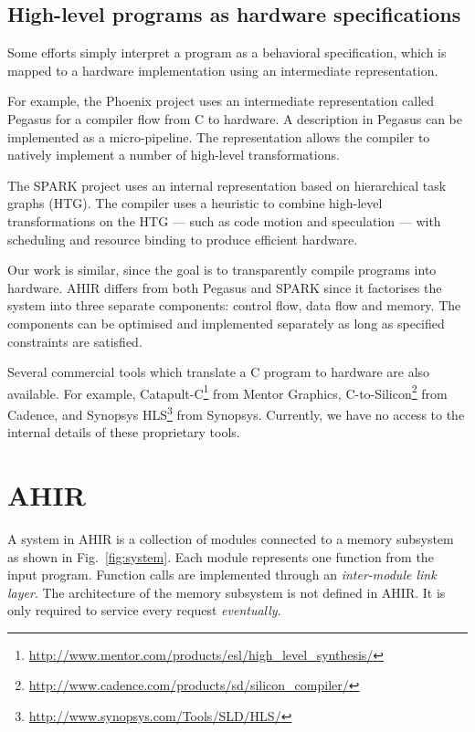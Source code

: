 \documentclass[conference]{IEEEtran}
\begin{document}
\subsection{High-level programs as hardware specifications}

Some efforts simply interpret a program as a behavioral
specification, which is mapped to a hardware implementation using an
intermediate representation.

For example, the Phoenix project uses an intermediate representation
called Pegasus\cite{pegasus-ir} for a compiler flow from C to
hardware\cite{pegasus-cash}. A description in Pegasus can be
implemented as a micro-pipeline. The representation allows the compiler
to natively implement a number of high-level transformations.

The SPARK\cite{spark-vlsi-paper} project uses an internal
representation based on hierarchical task graphs (HTG). The compiler
uses a heuristic to combine high-level transformations on the HTG ---
such as code motion and speculation\cite{spark-code-motion} --- with
scheduling and resource binding to produce efficient hardware.

Our work is similar, since the goal is to transparently compile
programs into hardware. AHIR differs from both Pegasus and SPARK since
it factorises the system into three separate components: control flow,
data flow and memory.  The components can be optimised and
implemented separately as long as specified constraints are satisfied.

Several commercial tools which translate a C program to hardware are
also available. For example,
Catapult-C\footnote{\url{http://www.mentor.com/products/esl/high_level_synthesis/}}
from Mentor Graphics,
C-to-Silicon\footnote{\url{http://www.cadence.com/products/sd/silicon_compiler/}}
from Cadence, and Synopsys
HLS\footnote{\url{http://www.synopsys.com/Tools/SLD/HLS/}} from
Synopsys. Currently, we have no access to the internal details of
these proprietary tools.


\section{AHIR}

A system in AHIR is a collection of modules connected to a memory
subsystem as shown in Fig.~\ref{fig:system}. Each module represents
one function from the input program. Function calls are implemented
through an \emph{inter-module link layer}. The architecture of the
memory subsystem is not defined in AHIR. It is only required to
service every request \emph{eventually}.
\end{document}
